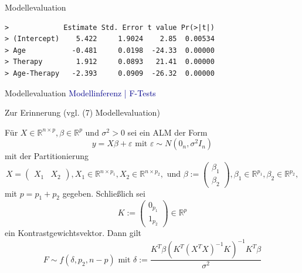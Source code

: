\documentclass[
  8pt,
  ignorenonframetext,
]{beamer}
\begin{document}
\begin{frame}[fragile]{Modellevaluation}
\begin{verbatim}
>             Estimate Std. Error t value Pr(>|t|)
> (Intercept)    5.422     1.9024    2.85  0.00534
> Age           -0.481     0.0198  -24.33  0.00000
> Therapy        1.912     0.0893   21.41  0.00000
> Age-Therapy   -2.393     0.0909  -26.32  0.00000
\end{verbatim}
\end{frame}

\begin{frame}{Modellevaluation}
\protect\hypertarget{modellevaluation-3}{}
\textcolor{darkblue}{Modellinferenz | F-Tests}

\small

Zur Erinnerung (vgl. (7) Modellevaluation)

\footnotesize
\begin{theorem}[F-Statistik]
\justifying
\normalfont
Für $X \in \mathbb{R}^{n \times p}, \beta \in \mathbb{R}^p$ und $\sigma^2 > 0$
sei ein ALM der Form
\begin{equation}
y = X\beta + \varepsilon \mbox{ mit } \varepsilon \sim N(0_n,\sigma^2I_n)
\end{equation}
mit der Partitionierung
\begin{equation}
X      = \begin{pmatrix} X_1     & X_2      \end{pmatrix},
X_1      \in \mathbb{R}^{n\times p_1},
X_2      \in \mathbb{R}^{n\times p_2},
\mbox{ und }
\beta := \begin{pmatrix} \beta_1 \\ \beta_2 \end{pmatrix},
\beta_1 \in \mathbb{R}^{p_1},
\beta_2 \in \mathbb{R}^{p_2},
\end{equation}
mit $p = p_1 + p_2$ gegeben. Schließlich sei
\begin{equation}
K := \begin{pmatrix} 0_{p_1} \\ 1_{p_2} \end{pmatrix} \in \mathbb{R}^p
\end{equation}
ein Kontrastgewichtsvektor. Dann gilt
\begin{equation}
F \sim f(\delta, p_2, n-p) \mbox{ mit } \delta := \frac{K^T\beta \left(K^T(X^TX)^{-1}K\right)^{-1}K^T \beta}{\sigma^2}
\end{equation}
\end{theorem}
\end{frame}
\end{document}
